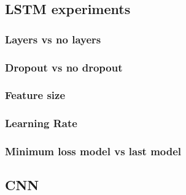 \subsection{LSTM experiments}

\subsubsection{Layers vs no layers}


\subsubsection{Dropout vs no dropout}


\subsubsection{Feature size}


\subsubsection{Learning Rate}


\subsubsection{Minimum loss model vs last model} %
%

\subsection{CNN}

